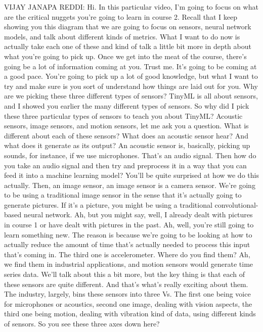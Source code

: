 VIJAY JANAPA REDDI: Hi.
In this particular video, I'm going to focus
on what are the critical nuggets you're going to learn in course 2.
Recall that I keep showing you this diagram
that we are going to focus on sensors, neural network models,
and talk about different kinds of metrics.
What I want to do now is actually take each one of these
and kind of talk a little bit more in depth
about what you're going to pick up.
Once we get into the meat of the course, there's
going be a lot of information coming at you.
Trust me.
It's going to be coming at a good pace.
You're going to pick up a lot of good knowledge,
but what I want to try and make sure is you sort of understand
how things are laid out for you.
Why are we picking these three different types of sensors?
TinyML is all about sensors, and I showed you
earlier the many different types of sensors.
So why did I pick these three particular types of sensors
to teach you about TinyML?
Acoustic sensors, image sensors, and motion sensors,
let me ask you a question.
What is different about each of these sensors?
What does an acoustic sensor hear?
And what does it generate as its output?
An acoustic sensor is, basically, picking up sounds,
for instance, if we use microphones.
That's an audio signal.
Then how do you take an audio signal and then try and preprocess it
in a way that you can feed it into a machine learning model?
You'll be quite surprised at how we do this actually.
Then, an image sensor, an image sensor is a camera sensor.
We're going to be using a traditional image sensor in the sense
that it's actually going to generate pictures.
If it's a picture, you might be using a traditional convolutional-based neural
network.
Ah, but you might say, well, I already dealt with pictures in course 1
or have dealt with pictures in the past.
Ah, well, you're still going to learn something new.
The reason is because we're going to be looking at how to actually reduce
the amount of time that's actually needed
to process this input that's coming in.
The third one is accelerometer.
Where do you find them?
Ah, we find them in industrial applications,
and motion sensors would generate time series data.
We'll talk about this a bit more, but the key thing
is that each of these sensors are quite different.
And that's what's really exciting about them.
The industry, largely, bins these sensors
into three Vs. The first one being voice for microphones or acoustics,
second one image, dealing with vision aspects, the third one being motion,
dealing with vibration kind of data, using different kinds of sensors.
So you see these three axes down here?
